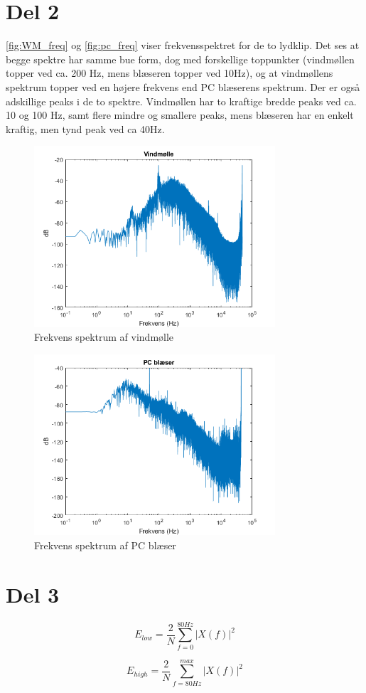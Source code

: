 \section{Del 2}

\autoref{fig:WM_freq} og \autoref{fig:pc_freq} viser frekvensspektret for de to lydklip. Det ses at begge spektre har samme bue form, dog med forskellige toppunkter (vindmøllen topper ved ca. 200 Hz, mens blæseren topper ved 10Hz), og at vindmøllens spektrum topper ved en højere frekvens end PC blæserens spektrum. Der er også adskillige peaks i de to spektre. Vindmøllen har to kraftige bredde peaks ved ca. 10 og 100 Hz, samt flere mindre og smallere peaks, mens blæseren har en enkelt kraftig, men tynd peak ved ca 40Hz. 


\begin{figure}[h]
\centering
\includegraphics[width=0.8\textwidth]{"figures/Windmill_frekvens"}
\caption{Frekvens spektrum af vindmølle}
\label{fig:WM_freq}
\end{figure}

\begin{figure}[h]
\centering
\includegraphics[width=0.8\textwidth]{"figures/pcFan_frekvens"}
\caption{Frekvens spektrum af PC blæser}
\label{fig:pc_freq}
\end{figure}


\section{Del 3}

\begin{equation}
E_{low} = \frac{2}{N} \sum_{f=0}^{80Hz} |X(f)|^2
\end{equation}

\begin{equation}
E_{high} = \frac{2}{N} \sum_{f=80Hz}^{max} |X(f)|^2
\end{equation}

